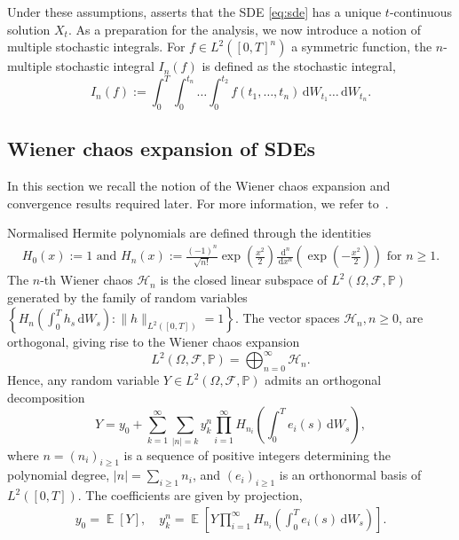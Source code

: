 \documentclass[12pt]{article}
\theoremstyle{remark}
\theoremstyle{plain}
\numberwithin{equation}{section}
\newcommand{\dd}{\ensuremath{\,\mathrm d}}
\DeclareMathOperator{\E}{\mathbb E}
\begin{document}
Under these assumptions, \cite[Theorem~5.2.1]{ksendal2003} asserts that the SDE \cref{eq:sde} has a unique $t$-continuous solution $X_t$.
As a preparation for the analysis, we now introduce a notion of multiple stochastic integrals.
For $f \in L^2([0,T]^n)$ a symmetric function, the $n$-multiple stochastic integral $I_n(f)$ is defined as the stochastic integral,
\begin{equation}
    I_n(f):= \int_0^T \int_0^{t_n} \dots \int_0^{t_2} f(t_1,\dots,t_n) \dd W_{t_1}\dots \dd W_{t_n}.
    \label{eq:multiple_stochastic_integrals}
\end{equation}

\subsection{Wiener chaos expansion of SDEs}
\label{sec:wiener chaos}

In this section we recall the notion of the Wiener chaos expansion and convergence results required later.
For more information, we refer to~\cite{MR2200233,janson1997gaussian}.

Normalised Hermite polynomials are defined through the identities
\begin{align}
    H_0(x) := 1\text{ and }
    H_n(x) := \frac{(-1)^n}{\sqrt{n!}} \exp\left(\frac{x^2}{2}\right)\frac{\dd^n}{\dd x^n}\left(\exp\left(-\frac{x^2}{2}\right)\right)\text{ for } n\geq 1\label{eq:hermite}.
\end{align}
The $n$-th Wiener chaos $\mathcal H_n$ is the closed linear subspace of $L^2(\Omega, \mathcal F, \mathbb P)$ generated by the family of random variables $\left\{H_n\left(\int_0^T h_s \dd W_s\right) : \|h\|_{L^2([0,T])}=1\right\}$. The vector spaces $\mathcal H_n,n\geq 0$, are orthogonal, giving rise to the Wiener chaos expansion~\cite[Theorem~1.1.1]{MR2200233}
\begin{equation}
    L^2(\Omega, \mathcal F, \mathbb P) = \bigoplus_{n=0}^\infty \mathcal H_n.
\end{equation}
%
Hence, any random variable $Y \in L^2(\Omega, \mathcal F, \mathbb P)$ admits an orthogonal decomposition
\begin{equation}
    Y = y_0 + \sum_{k=1}^\infty \sum_{|n|=k} y_k^n \prod_{i=1}^\infty H_{n_i}\left(\int_0^T e_i(s)\dd W_s\right),\label{eq:chaos_expansion}
\end{equation}
where $n=(n_i)_{i \geq 1}$ is a sequence of positive integers determining the polynomial degree, $|n|=\sum_{i \geq 1}n_i$, and $(e_i)_{i \geq 1}$ is an orthonormal basis of $L^2([0,T])$.
The coefficients are given by projection,
\begin{align*}
    y_0 = \E[Y],\quad
    y_k^n = \E\left[Y \prod_{i=1}^\infty H_{n_i}\left(\int_0^T e_i(s)\dd W_s\right)\right].
\end{align*}
\end{document}

